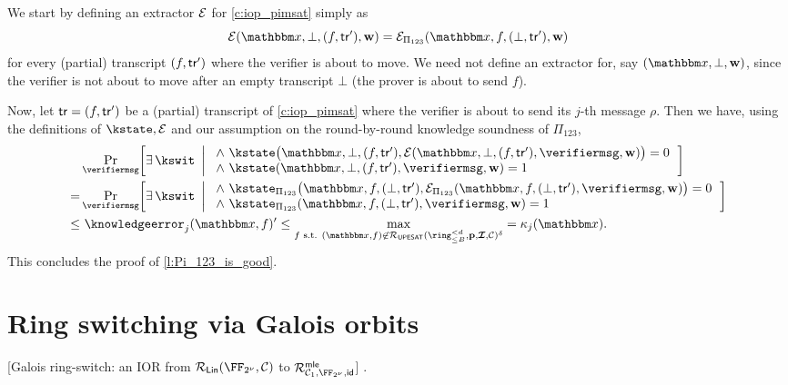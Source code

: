 \documentclass[11pt,letterpaper,usenames,dvipsnames]{article}
\begin{document}
We start by defining an extractor $\mathcal{E}$ for \cref{c:iop_pimsat} simply as $$\cE(\inp,\bot, (f,\tr'),\ww)= \cE_{\Pi_{123}}(\inp,f, (\bot,\tr'), \ww)$$ for every (partial) transcript $(f,\mathsf{tr}')$ where the verifier is about to move. We need not define an extractor for, say $(\inp, \bot, \ww)$, since the verifier is not about to move after an empty transcript $\bot$ (the prover is about to send $f$).
%

%
Now, let $\mathsf{tr}=(f,\mathsf{tr}')$ be a (partial)  transcript of \cref{c:iop_pimsat} where the verifier is about to send its $j$-th message $\rho$. Then we have, using the definitions of $\kstate, \cE$ and our assumption on the round-by-round knowledge soundness of $\Pi_{123}$,
%
\begin{align*}
  &\Pr_{\verifiermsg}\!\left[
  \exists\,\kswit \ \left| \ \begin{array}{l}
  \wedge\ \kstate\bigl(\inp,\bot,(f,\tr'),\cE(\inp,\bot, (f,\tr'),\verifiermsg,\ww)\bigr)=0\\
  \wedge\ \kstate(\inp,\bot, (f,\tr'),\verifiermsg,\ww)=1
  \end{array}
  \right.\right]\\ = 
  &\Pr_{\verifiermsg}\!\left[
  \exists\,\kswit \ \left| \ \begin{array}{l}
  \wedge\ \kstate_{\Pi_{123}}\bigl(\inp,f,(\bot,\tr'),\cE_{\Pi_{123}}(\inp,f, (\bot,\tr'),\verifiermsg,\ww)\bigr)=0\\
  \wedge\ \kstate_{\Pi_{123}}(\inp,f,(\bot,\tr'),\verifiermsg,\ww)=1
  \end{array}
  \right.\right] \\ \le&\ \knowledgeerror_j(\inp, f)' \leq \max_{f \text{ s.t. } (\inp,f)\not\in \PIMSAT(\ringtwobounds{B}{\moduledegree}, \pp,\bm{\ideal}, \cC)^\delta} = \kappa_j(\inp).
\end{align*}
%
This concludes the proof of \cref{l:Pi_123_is_good}.


\section{Ring switching via Galois orbits}\label{s:ring_switch}





\begin{construction}\label{c: Galois ring-switch IOP}[Galois ring-switch: an IOR from $\LIN(\comfield,\cC)$ to  $\Relation^{\mathsf{mle}}_{\cC_1, \comfield,\mathsf{id}}$]
  .
  
\end{construction}
\end{document}
